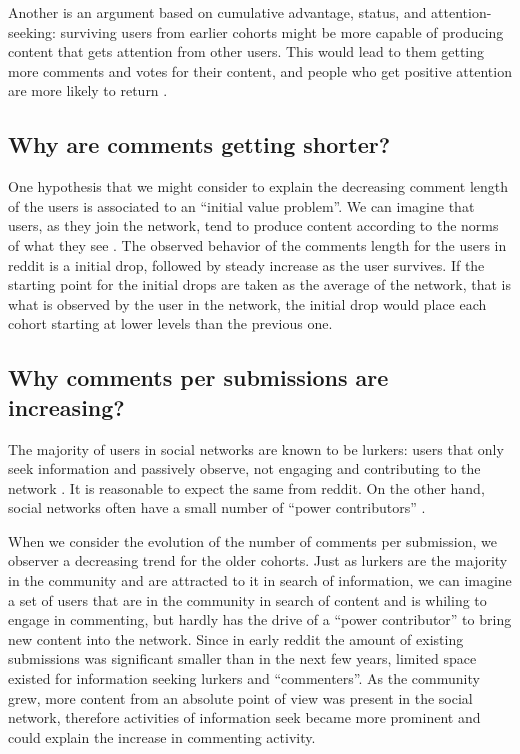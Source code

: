 Another is an argument based on cumulative advantage, status, and attention-seeking: surviving users from earlier cohorts might be more capable of producing content that gets attention from other users.  This would lead to them getting more comments and votes for their content, and people who get positive attention are more likely to return \cite{Halfaker2009, Choi2010, Sarkar2012}.  

\subsection{Why are comments getting shorter?}

One hypothesis that we might consider to explain the decreasing comment length of the users is associated to an ``initial value problem''. We can imagine that users, as they join the network, tend to produce content according to the norms of what they see \cite{Kooti2010, Danescu-niculescu-mizil2013}. The observed behavior of the comments length for the users in reddit is a initial drop, followed by steady increase as the user survives. If the starting point for the initial drops are taken as the average of the network, that is what is observed by the user in the network, the initial drop would place each cohort starting at lower levels than the previous one.

\subsection{Why comments per submissions are increasing?}

The majority of users in social networks are known to be lurkers: users that only seek information and passively observe, not engaging and contributing to the network \cite{Rafaeli2004, Nonnecke2000}. It is reasonable to expect the same from reddit. On the other hand, social networks often have a small number of ``power contributors'' \cite{Panciera2009, Kittur2007}.

When we consider the evolution of the number of comments per submission, we observer a decreasing trend for the older cohorts. Just as lurkers are the majority in the community and are attracted to it in search of information, we can imagine a set of users that are in the community in search of content and is whiling to engage in commenting, but hardly has the drive of a ``power contributor'' to bring new content into the network. Since in early reddit the amount of existing submissions was significant smaller than in the next few years, limited space existed for information seeking lurkers and ``commenters''. As the community grew, more content from an absolute point of view was present in the social network, therefore activities of information seek became more prominent and could explain the increase in commenting activity. 

